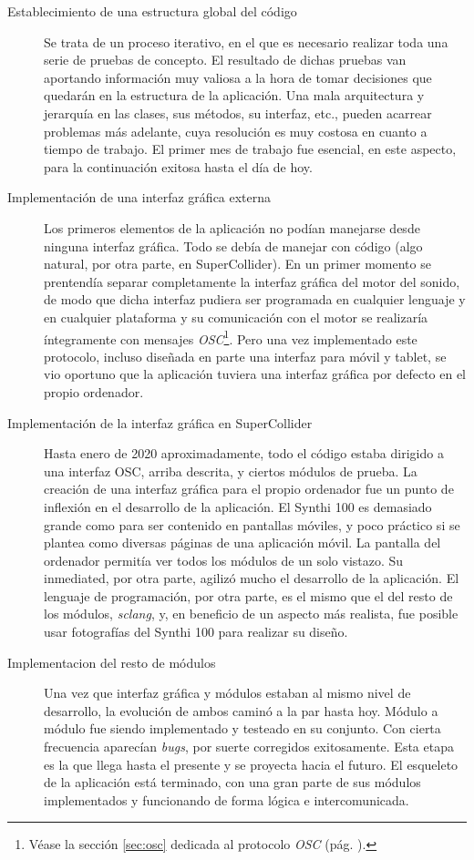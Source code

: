 \begin{description} 
	\item[Establecimiento de una estructura global del código] Se trata de un proceso iterativo, en el que es necesario realizar toda una serie de pruebas de concepto. El resultado de dichas pruebas van aportando información muy valiosa a la hora de tomar decisiones que quedarán en la estructura de la aplicación. Una mala arquitectura y jerarquía en las clases, sus métodos, su interfaz, etc., pueden acarrear problemas más adelante, cuya resolución es muy costosa en cuanto a tiempo de trabajo. El primer mes de trabajo fue esencial, en este aspecto, para la continuación exitosa hasta el día de hoy.
	
	\item[Implementación de una interfaz gráfica externa] Los primeros elementos de la aplicación no podían manejarse desde ninguna interfaz gráfica. Todo se debía de manejar con código (algo natural, por otra parte, en SuperCollider). En un primer momento se prentendía separar completamente la interfaz gráfica del motor del sonido, de modo que dicha interfaz pudiera ser programada en cualquier lenguaje y en cualquier plataforma y su comunicación con el motor se realizaría íntegramente con mensajes \textit{OSC}\footnote{Véase la sección \ref{sec:osc} dedicada al protocolo \textit{OSC} (pág. \pageref{sec:osc}).}. Pero una vez implementado este protocolo, incluso diseñada en parte una interfaz para móvil y tablet, se vio oportuno que la aplicación tuviera una interfaz gráfica  por defecto en el propio ordenador.
	
	\item[Implementación de la interfaz gráfica en SuperCollider] Hasta enero de 2020 aproximadamente, todo el código estaba dirigido a una interfaz OSC, arriba descrita, y ciertos módulos de prueba. La creación de una interfaz gráfica para el propio ordenador fue un punto de inflexión en el desarrollo de la aplicación. El Synthi 100 es demasiado grande como para ser contenido en pantallas móviles, y poco práctico si se plantea como diversas páginas de una aplicación móvil. La pantalla del ordenador permitía ver todos los módulos de un solo vistazo. Su inmediated, por otra parte, agilizó mucho el desarrollo de la aplicación. El lenguaje de programación, por otra parte, es el mismo que el del resto de los módulos, \textit{sclang}, y, en beneficio de un aspecto más realista, fue posible usar fotografías del Synthi 100 para realizar su diseño.
	
	\item[Implementacion del resto de módulos] Una vez que interfaz gráfica y módulos estaban al mismo nivel de desarrollo, la evolución de ambos caminó a la par hasta hoy. Módulo a módulo fue siendo implementado y testeado en su conjunto. Con cierta frecuencia aparecían \textit{bugs}, por suerte corregidos exitosamente. Esta etapa es la que llega hasta el presente y se proyecta hacia el futuro. El esqueleto de la aplicación está terminado, con una gran parte de sus módulos implementados y funcionando de forma lógica e intercomunicada.
\end{description}




